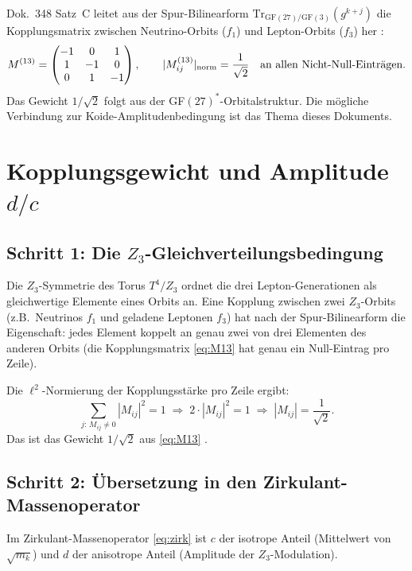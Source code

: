 Dok.~348 Satz~C leitet aus der Spur-Bilinearform
$\mathrm{Tr}_{\mathrm{GF}(27)/\mathrm{GF}(3)}(g^{k+j})$
die Kopplungsmatrix zwischen Neutrino-Orbits ($f_1$) und
Lepton-Orbits ($f_3$) her \BM:
\begin{equation}
  M^{(13)} = \begin{pmatrix} -1 & 0 & 1 \\ 1 & -1 & 0 \\ 0 & 1 & -1 \end{pmatrix},
  \qquad |M^{(13)}_{ij}|_{\rm norm} = \frac{1}{\sqrt{2}}
  \quad\text{an allen Nicht-Null-Einträgen.}
  \label{eq:M13}
\end{equation}
Das Gewicht $1/\sqrt{2}$ folgt aus der GF$(27)^*$-Orbitalstruktur.
Die mögliche Verbindung zur Koide-Amplitudenbedingung ist das Thema dieses Dokuments.

\section{Kopplungsgewicht und Amplitude $d/c$}

\subsection*{Schritt 1: Die $Z_3$-Gleichverteilungsbedingung}

Die $Z_3$-Symmetrie des Torus $T^4/Z_3$ ordnet die drei Lepton-Generationen
als gleichwertige Elemente eines Orbits an. Eine Kopplung zwischen zwei
$Z_3$-Orbits (z.B.\ Neutrinos $f_1$ und geladene Leptonen $f_3$) hat
nach der Spur-Bilinearform die Eigenschaft: jedes Element koppelt an
genau zwei von drei Elementen des anderen Orbits (die Kopplungsmatrix
\eqref{eq:M13} hat genau ein Null-Eintrag pro Zeile).

Die $\ell^2$-Normierung der Kopplungsstärke pro Zeile ergibt:
\begin{equation}
  \sum_{j:\,M_{ij}\neq 0} |M_{ij}|^2 = 1
  \;\Longrightarrow\;
  2\cdot|M_{ij}|^2 = 1
  \;\Longrightarrow\;
  |M_{ij}| = \frac{1}{\sqrt{2}}.
  \label{eq:norm}
\end{equation}
Das ist das Gewicht $1/\sqrt{2}$ aus \eqref{eq:M13} \BM.

\subsection*{Schritt 2: Übersetzung in den Zirkulant-Massenoperator}

Im Zirkulant-Massenoperator \eqref{eq:zirk} ist $c$ der isotrope Anteil
(Mittelwert von $\sqrt{m_k}$) und $d$ der anisotrope Anteil (Amplitude
der $Z_3$-Modulation).

